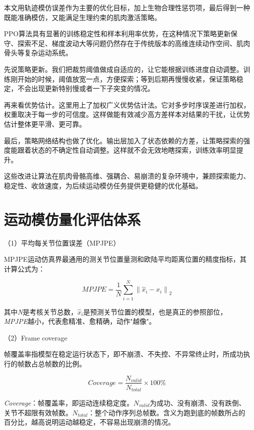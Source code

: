 本文用轨迹模仿误差作为主要的优化目标，加上生物合理性惩罚项，最后得到一种既能准确模仿，又能满足生理约束的肌肉激活策略。

PPO算法具有显著的训练稳定性和样本利用率优势，在这种情况下策略更新保守、探索不足、梯度波动大等问题仍然存在于传统版本的高维连续动作空间、肌肉骨头等复杂运动系统。

先说策略更新。我们把裁剪阈值做成自适应的，让它能根据训练进度自动调整。训练刚开始的时候，阈值放宽一点，方便探索；等到后期再慢慢收紧，保证策略稳定，不会出现更新特别慢或者一下子突变的情况。

再来看优势估计。这里用上了加权广义优势估计法。它对多步时序误差进行加权，权重取决于每一步的可信度。这样做能有效减少高方差样本对结果的干扰，让优势估计整体更平滑、更可靠。

最后，策略网络结构也做了优化。输出层加入了状态依赖的方差，让策略探索的强度能跟着状态的不确定性自动调整。这样就不会无效地瞎探索，训练效率明显提升。

这些改进让算法在肌肉骨骼高维、强耦合、易崩溃的复杂环境中，兼顾探索能力、稳定性、收敛速度，为后续运动模仿任务提供更稳健的优化基础。

\section{运动模仿量化评估体系}\label{ux8fd0ux52a8ux6a21ux4effux91cfux5316ux8bc4ux4f30ux4f53ux7cfb}

（1）平均每关节位置误差（MPJPE）

MPJPE运动仿真界最通用的测关节位置量测和欧陆平均距离位置的精度指标，其计算公式为：

\begin{equation}
MPJPE = \frac{1}{N}\sum_{i=1}^{N}\left\|\widehat{x}_{i}-x_{i}\right\|_{2}
\tag{2-1}
\end{equation}

其中\emph{N}是考核关节总数，\({\widehat{x}}_{i}\)是预测关节位置的模型，也是真正的参照部位，\emph{MPJPE}越小，代表愈精准、愈精确，动作"越像"。

（2）Frame coverage

帧覆盖率指模型在稳定运行状态下，即不崩溃、不失控、不异常终止时，所成功执行的帧数占总帧数的比例。

\begin{equation}
Coverage = \frac{N_{valid}}{N_{total}} \times 100\%
\tag{2-2}
\end{equation}

\emph{Coverage}：帧覆盖率，即运动连续稳定度。\(N_{valid}\)为成功、没有崩溃、没有跌倒、关节不超限有效帧数。\(N_{total}\)：整个动作序列总帧数。含义为跑到底的帧数所占的百分比，越高说明运动越稳定，不容易出现崩溃的情况。

